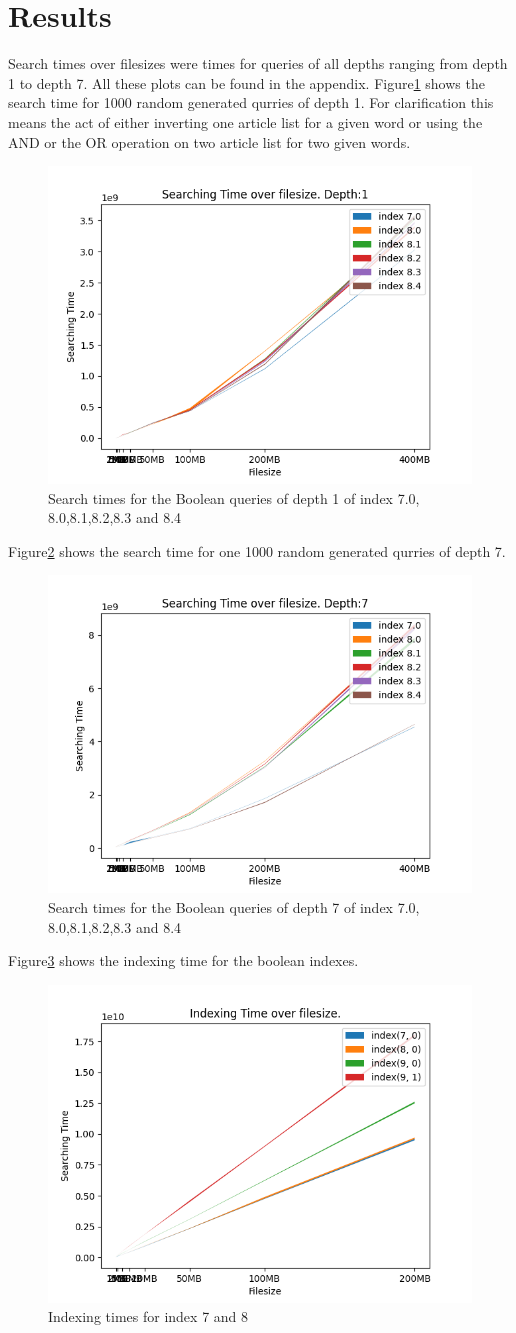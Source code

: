 \section{Results}
Search times over filesizes were times for queries of all depths ranging from depth 1 to depth 7. All these plots can be found in the appendix. Figure\ref{fig:Searchtimebool1} shows the search time for 1000 random generated qurries of depth 1. For clarification this means the act of either inverting one article list for a given word or using the AND or the OR operation on two article list for two given words.

\begin{figure}[ht!]
    \centering
    \includegraphics[width=.5\textwidth]{LaTeX/Pictures/Results/BooleanSearchDepth0.png}
    \caption{Search times for the Boolean queries of depth 1 of index 7.0, 8.0,8.1,8.2,8.3 and 8.4}
    \label{fig:Searchtimebool1}
\end{figure}

Figure\ref{fig:Searchtimebool7} shows the search time for one 1000 random generated qurries of depth 7.

\begin{figure}[ht!]
    \centering
    \includegraphics[width=.5\textwidth]{LaTeX/Pictures/Results/BooleanSearchDepth6.png}
    \caption{Search times for the Boolean queries of depth 7 of index 7.0, 8.0,8.1,8.2,8.3 and 8.4}
    \label{fig:Searchtimebool7}
\end{figure}

Figure\ref{fig:IndexingBool} shows the indexing time for the boolean indexes.

\begin{figure}[ht!]
    \centering
    \includegraphics[width=.5\textwidth]{LaTeX/Pictures/Results/BooleanSearchIndexes.png}
    \caption{Indexing times for index 7 and 8}
    \label{fig:IndexingBool}
\end{figure}